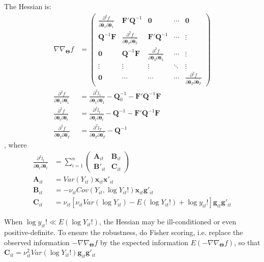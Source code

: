 \documentclass[]{article}
\begin{document}
\begin{appendices}
		The Hessian is:
		\begin{align}
			\nabla\nabla_{\bm{\Theta}}f &=
			\begin{pmatrix}
				\frac{\partial^{2}f}{\partial\bm{\theta}_{1}\partial\bm{\theta}_{1}^{'}} & \bm{F}'\bm{Q}^{-1} &\bm{0} & \cdots & \bm{0} \\
				\bm{Q}^{- 1}\bm{F} & \frac{\partial^{2}f}{\partial\bm{\theta}_{2}\partial\bm{\theta}_{2}^{'}}&\bm{F}'\bm{Q}^{-1} & \cdots & \vdots \\
				\bm{0} & \bm{Q}^{-1}\bm{F}  & \frac{\partial^{2}f}{\partial\bm{\theta}_{3}\partial\bm{\theta}_{3}^{'}} & \cdots & \vdots\\
				\vdots & \vdots & \vdots & \ddots & \vdots \\
				\bm{0} & \cdots & \cdots & \cdots & \frac{\partial^{2}f}{\partial\bm{\theta}_{T}\partial\bm{\theta}_{T}^{'}}
			\end{pmatrix}\\
			\frac{\partial^{2}f}{\partial\bm{\theta}_{1}\partial\bm{\theta}_{1}^{'}}  &= \frac{\partial^{2}l_1}{\partial\bm{\theta}_{1}\partial\bm{\theta}_{1}^{'}} - \bm{Q}_0^{-1} - \bm{F}'\bm{Q}^{-1}\bm{F} \nonumber\\
			\frac{\partial^{2}f}{\partial\bm{\theta}_{t}\partial\bm{\theta}_{t}^{'}}  &= \frac{\partial^{2}l_t}{\partial\bm{\theta}_{t}\partial\bm{\theta}_{t}^{'}} - \bm{Q}^{-1} - \bm{F}'\bm{Q}^{-1}\bm{F} \nonumber\\
			\frac{\partial^{2}f}{\partial\bm{\theta}_{T}\partial\bm{\theta}_{T}^{'}}  &= \frac{\partial^{2}l_T}{\partial\bm{\theta}_{T}\partial\bm{\theta}_{T}^{'}} - \bm{Q}^{-1} \nonumber
		\end{align}
		, where
		\begin{align}
			\frac{\partial^{2}l_t}{\partial\bm{\theta}_{t}\partial\bm{\theta}_{t}^{'}} &= \sum_{i = 1}^{n}\begin{pmatrix}
				\bm{A}_{it} & \bm{B}_{it}\\
				\bm{B}'_{it} & \bm{C}_{it}
			\end{pmatrix}\\
			\bm{A}_{it} &= Var(Y_{it})\bm{x}_{it}\bm{x}'_{it} \nonumber\\
			\bm{B}_{it} &= -\nu_{it}Cov(Y_{it}, \log Y_{it}!)\bm{x}_{it}\bm{g}'_{it} \nonumber\\
			\bm{C}_{it} &= \nu_{it}[\nu_{it}Var(\log Y_{it}) - E(\log Y_{it}!) + \log y_{it}!]\bm{g}_{it}\bm{g}'_{it} \nonumber
		\end{align}
		
		When $\log y_{it}! \ll E(\log Y_{it}!)$, the Hessian may be ill-conditioned or even positive-definite. To ensure the robustness, do Fisher scoring, i.e. replace the observed information $-\nabla\nabla_{\bm{\Theta}}f$ by the expected information $E(-\nabla\nabla_{\bm{\Theta}}f)$, so that $\bm{C}_{it} = \nu_{it}^2Var(\log Y_{it}!)\bm{g}_{it}\bm{g}'_{it}$
	\end{appendices}
	
	
	
\end{document}
